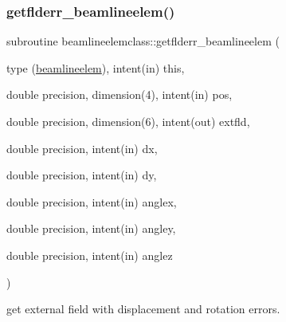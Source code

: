 \subsubsection{\texorpdfstring{getflderr\_beamlineelem()}{getflderr\_beamlineelem()}}
{\footnotesize\ttfamily subroutine beamlineelemclass\+::getflderr\+\_\+beamlineelem (\begin{DoxyParamCaption}\item[{type (\mbox{\hyperlink{namespacebeamlineelemclass_structbeamlineelemclass_1_1beamlineelem}{beamlineelem}}), intent(in)}]{this,  }\item[{double precision, dimension(4), intent(in)}]{pos,  }\item[{double precision, dimension(6), intent(out)}]{extfld,  }\item[{double precision, intent(in)}]{dx,  }\item[{double precision, intent(in)}]{dy,  }\item[{double precision, intent(in)}]{anglex,  }\item[{double precision, intent(in)}]{angley,  }\item[{double precision, intent(in)}]{anglez }\end{DoxyParamCaption})}



get external field with displacement and rotation errors. 

